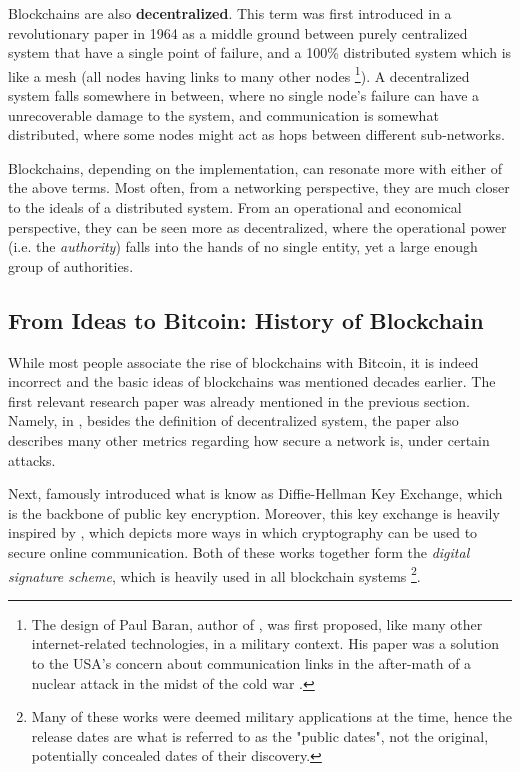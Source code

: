 Blockchains are also \textbf{decentralized}. This term was first introduced in a revolutionary paper
in 1964 as a middle ground between purely centralized system that have a single point of failure,
and a 100\% distributed system which is like a mesh (all nodes having links to many other nodes
\cite{baranDistributedCommunicationsNetworks1964} \footnote{The design of Paul Baran, author of
\cite{baranDistributedCommunicationsNetworks1964}, was first proposed, like many other
internet-related technologies, in a military context. His paper was a solution to the USA's concern
about communication links in the after-math of a nuclear attack in the midst of the cold war
\cite{monicaPaulBaranOrigins}.}). A decentralized system falls somewhere in between, where no single
node's failure can have a unrecoverable damage to the system, and communication is somewhat
distributed, where some nodes might act as hops between different sub-networks.

Blockchains, depending on the implementation, can resonate more with either of the above terms. Most
often, from a networking perspective, they are much closer to the ideals of a distributed system.
From an operational and economical perspective, they can be seen more as decentralized, where the
operational power (i.e. the \textit{authority}) falls into the hands of no single entity, yet a
large enough group of authorities.


\subsection{From Ideas to Bitcoin: History of Blockchain} \label{chap_bg_:subsec:hisotry}

While most people associate the rise of blockchains with Bitcoin, it is indeed incorrect and the
basic ideas of blockchains was mentioned decades earlier. The first relevant research paper was
already mentioned in the previous section. Namely, in
\cite{baranDistributedCommunicationsNetworks1964}, besides the definition of decentralized system,
the paper also describes many other metrics regarding how secure a network is, under certain
attacks.

Next, \cite{diffieNewDirectionsCryptography1976} famously introduced what is know as Diffie-Hellman
Key Exchange, which is the backbone of public key encryption. Moreover, this key exchange is heavily
inspired by \cite{merkleSecureCommunicationsInsecure1978}, which depicts more ways in which
cryptography can be used to secure online communication. Both of these works together form the
\textit{digital signature scheme}, which is heavily used in all blockchain systems \footnote{Many of
these works were deemed military applications at the time, hence the release dates are what is
referred to as the "public dates", not the original, potentially concealed dates of their
discovery.}.

